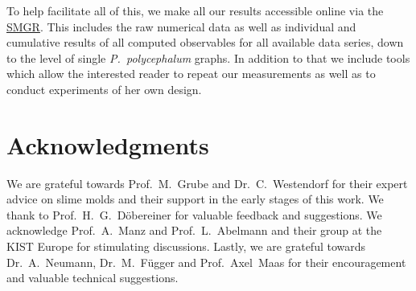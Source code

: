 			To help facilitate all of this, we make all our results accessible online via the \href{http://smgr.mpi-inf.mpg.de}{SMGR}. This includes the raw numerical data as well as individual and cumulative results of all computed observables for all available data series, down to the level of single \emph{P.~polycephalum} graphs. In addition to that we include tools which allow the interested reader to repeat our measurements as well as to conduct experiments of her own design.

	\section{Acknowledgments}

		We are grateful towards Prof.~M.~Grube and Dr.~C.~Westendorf for their expert advice on slime molds and their support in the early stages of this work. We thank to Prof.~H.~G.~D\"obereiner for valuable feedback and suggestions. We acknowledge Prof.~A.~Manz and Prof.~L.~Abelmann and their group at the KIST Europe for stimulating discussions. Lastly, we are grateful towards Dr.~A.~Neumann, Dr.~M.~F\"ugger and Prof.~Axel~Maas for their encouragement and valuable technical suggestions.

